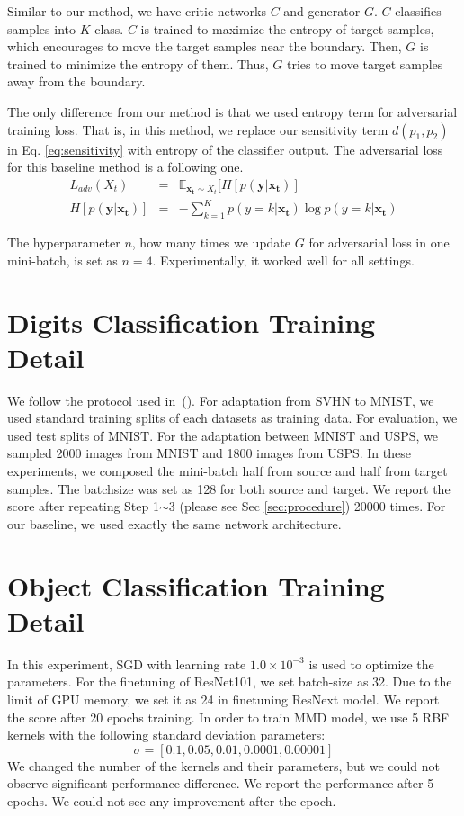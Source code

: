 \documentclass{article} \usepackage{iclr2018_conference,times}
\begin{document}
Similar to our method, we have critic networks $C$ and generator $G$. $C$ classifies samples into $K$ class.
$C$ is trained to maximize the entropy of target samples, which encourages to move the target samples near the boundary. Then, $G$ is trained to minimize the entropy of them. Thus, $G$ tries to move target samples away from the boundary.

The only difference from our method is that we used entropy term for adversarial training loss. That is, in this method, we replace our sensitivity term $d(p_1,p_2)$ in Eq. \ref{eq:sensitivity} with entropy of the classifier output. The adversarial loss for this baseline method is a following one.
\begin{eqnarray}
  L_{adv}(X_{t}) &=&{\mathbb{E}_{\mathbf{x_{t}}\sim X_{t}}}[H[p(\mathbf{y}|\mathbf{x_t})]\\
    \label{eq:adv_entropy}
  H[p(\mathbf{y}|\mathbf{x_t})] &=& - \sum_{k=1}^{K}p(y=k|\mathbf{x_t})\log p(y=k|\mathbf{x_t})
    \label{eq:entropy}
\end{eqnarray}

The hyperparameter $n$, how many times we update $G$ for adversarial loss in one mini-batch, is set as $n=4$. Experimentally, it worked well for all settings.  

\vspace{-3mm}
\section{Digits Classification Training Detail}
\vspace{-3mm}
We follow the protocol used in~(\cite{tzeng2017adversarial}). For adaptation from SVHN to MNIST, we used standard training splits of each datasets as training data. For evaluation, we used test splits of MNIST. For the adaptation between MNIST and USPS, we sampled 2000 images from MNIST and 1800 images from USPS.
In these experiments, we composed the mini-batch half from source and half from target samples. The batchsize was set as 128 for both source and target. We report the score after repeating Step 1$\sim$3 (please see Sec \ref{sec:procedure}) 20000 times. For our baseline, we used exactly the same network architecture.
\vspace{-3mm}
\section{Object Classification Training Detail}
\vspace{-3mm}
In this experiment, SGD with learning rate $1.0\times10^{-3}$ is used to optimize the parameters. 
For the finetuning of ResNet101, we set batch-size as 32. Due to the limit of GPU memory, we set it as 24 in finetuning ResNext model. We report the score after 20 epochs training.
In order to train MMD model, we use 5 RBF kernels with the following standard deviation parameters:
\begin{equation}
  \sigma = [0.1,0.05,0.01,0.0001,0.00001]
\end{equation}
We changed the number of the kernels and their parameters, but we could not observe significant performance difference. We report the performance after 5 epochs. We could not see any improvement after the epoch.
\end{document}
